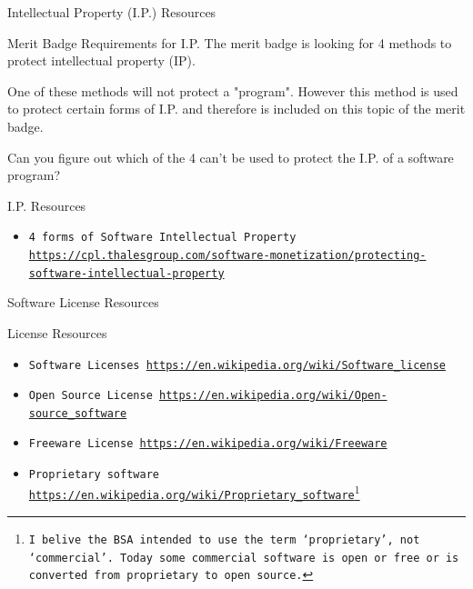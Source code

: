 \documentclass[10pt]{beamer}
\begin{document}
{%

\begin{frame}{Intellectual Property (I.P.) Resources}{}
\begin{block}{Merit Badge Requirements for I.P.}
The merit badge is looking for 4 methods to protect intellectual property (IP).

One of these methods will not protect a "program".  However this method is used to protect certain forms of I.P. and therefore is included on this topic of the merit badge.

Can you figure out which of the 4 can't be used to protect the I.P. of a software program?
\end{block}
\begin{block}{I.P. Resources}
  \begin{itemize}
    \item {\tt 4 forms of Software Intellectual Property \url{https://cpl.thalesgroup.com/software-monetization/protecting-software-intellectual-property}}
    \end{itemize}
  \end{block}
\end{frame}


\begin{frame}{Software License Resources}{}
\begin{block}{License Resources}
  \begin{itemize}
    \item {\tt Software Licenses \url{https://en.wikipedia.org/wiki/Software_license}}
    \item {\tt Open Source License \url{https://en.wikipedia.org/wiki/Open-source_software}}
    \item {\tt Freeware License \url{https://en.wikipedia.org/wiki/Freeware}}
    \item {\tt Proprietary software \url{https://en.wikipedia.org/wiki/Proprietary_software}\footnote{I belive the BSA intended to use the term `proprietary', not `commercial'. Today some commercial software is open or free or is converted from proprietary to open source.}}
  \end{itemize}
\end{block}
\end{frame}

}
\end{document}
